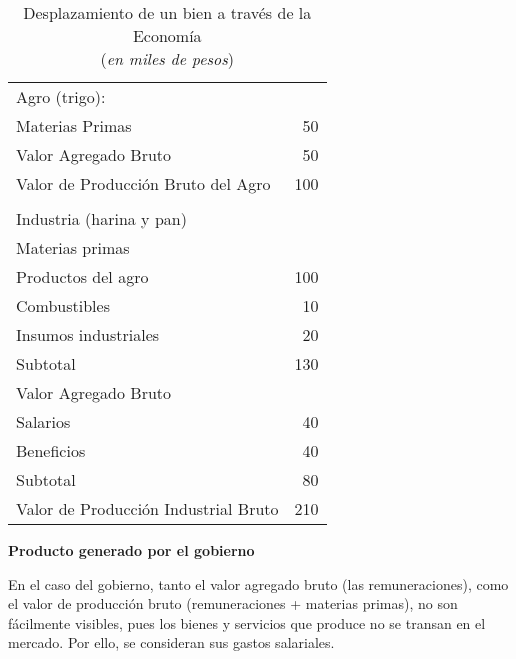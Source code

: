 \vspace{.5cm}
\begin{table}[H]
    \centering
    \caption{\\Desplazamiento de un bien a través de la Economía\\
        (\textit{en miles de pesos})}
    \vspace{.5cm}
    \begin{tabular}{lr}
        \hline
        Agro (trigo):                        &     \\
        Materias Primas                      & 50  \\
        Valor Agregado Bruto                 & 50  \\
        Valor de Producción Bruto del Agro   & 100 \\
        \hline                                     \\
        \hline
        Industria (harina y pan)             &     \\
        Materias primas                      &     \\
        \hspace{.3cm}Productos del agro      & 100 \\
        \hspace{.3cm}Combustibles            & 10  \\
        \hspace{.3cm}Insumos industriales    & 20  \\
        Subtotal                             & 130 \\
        \hline
        Valor Agregado Bruto                 &     \\
        \hspace{.3cm}Salarios                & 40  \\
        \hspace{.3cm}Beneficios              & 40  \\
        Subtotal                             & 80  \\
        \hline
        Valor de Producción Industrial Bruto & 210 \\
    \end{tabular}
\end{table}
\vspace{.5cm}

\textbf{Producto generado por el gobierno}

En el caso del gobierno,
tanto el valor agregado bruto (las remuneraciones),
como el valor de producción bruto (remuneraciones + materias primas),
no son fácilmente visibles,
pues los bienes y servicios que produce no se transan en el mercado.
Por ello,
se consideran sus gastos salariales.

